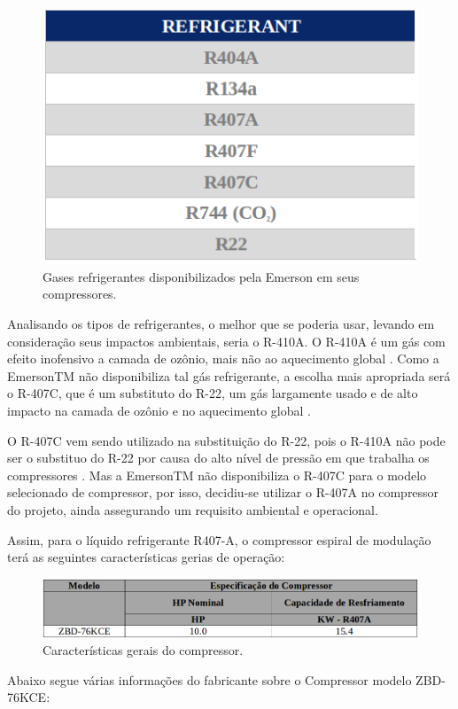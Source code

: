 	\begin{figure}[!htbp]
	  \centering
	  \includegraphics[scale=0.4]{editaveis/figuras/tabela_gases_refrigerantes}
	  \caption[Gases refrigerantes]{Gases refrigerantes disponibilizados pela Emerson em seus compressores.\footnotemark}
	  \label{gases_compressores}
	\end{figure}
\FloatBarrier
Analisando os tipos de refrigerantes, o melhor que se poderia usar, levando em consideração seus impactos ambientais, seria o R-410A. O R-410A é um gás com efeito inofensivo a camada de ozônio, mais não ao aquecimento global \cite{essencials_r410A}. Como a EmersonTM não disponibiliza tal gás refrigerante, a escolha mais apropriada será o R-407C, que é  um substituto do R-22, um gás largamente usado e de alto impacto na camada de ozônio e no aquecimento global \cite{epa2014}. 

O R-407C vem sendo utilizado na substituição do R-22, pois o R-410A não pode ser o substituo do R-22 por causa do alto nível de pressão em que trabalha os compressores \cite{epa2014}. Mas a EmersonTM não disponibiliza o R-407C para o modelo selecionado de compressor, por isso, decidiu-se utilizar o R-407A no compressor do projeto, ainda assegurando um requisito ambiental e operacional. 

Assim, para o líquido refrigerante R407-A, o compressor espiral de modulação terá as seguintes características gerias de operação: 

	\begin{figure}[!htbp]
	  \centering
	  \includegraphics[scale=0.4]{editaveis/figuras/tabela_especificacao_compressor}
	  \caption[Especificação Compressor]{Características gerais do compressor.\footnotemark}
	  \label{gases_compressores}
	\end{figure}
	\FloatBarrier
Abaixo segue várias informações do fabricante sobre o Compressor modelo ZBD-76KCE:

